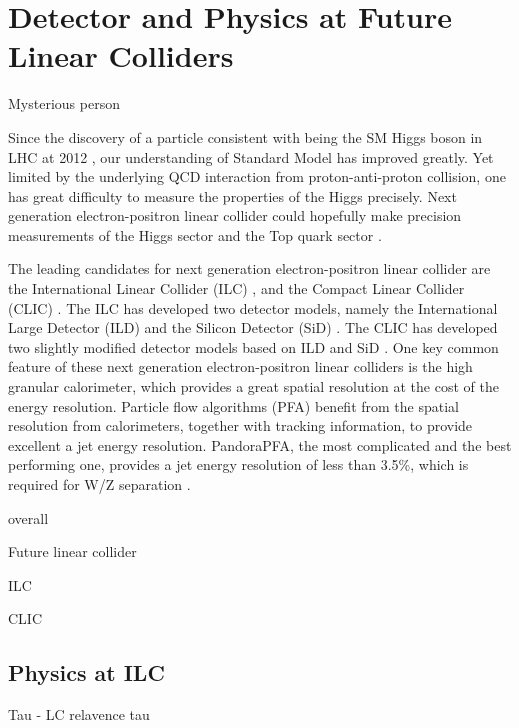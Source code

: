 \chapter{Detector and Physics at Future Linear Colliders}
\label{chap:Detector}

%
{Mysterious person}%





Since the discovery of a particle consistent with being the SM Higgs boson in LHC at 2012 \cite{Aad:2012tfa,Chatrchyan:2012ufa}, our understanding of Standard Model has improved greatly. Yet limited by the underlying QCD interaction from proton-anti-proton collision, one has great difficulty to measure the properties of the Higgs precisely. Next generation electron-positron linear collider could hopefully make precision measurements of the Higgs sector and the Top quark sector \cite{Abramowicz:2013tzc}.

The leading candidates for next generation electron-positron linear collider are the International Linear Collider (ILC) \cite{Brau:2007zza}, and the Compact Linear Collider (CLIC) \cite{Linssen:2012hp}. The ILC has developed two detector models, namely the International Large Detector (ILD) \cite{Abe:2010aa} and the Silicon Detector (SiD) \cite{Aihara:2010zz}. The CLIC has developed two slightly modified detector models based on ILD and SiD \cite{Linssen:2012hp}. One key common feature of these next generation electron-positron linear colliders is the high granular calorimeter, which provides a great spatial resolution at the cost of the energy resolution. Particle flow algorithms (PFA) benefit from the spatial resolution from calorimeters, together with tracking information, to provide excellent a jet energy resolution. PandoraPFA, the most complicated and the best performing one, provides a jet energy resolution of less than 3.5\%, which is required for W/Z separation \cite{Thomson:2009rp,Marshall:2013bda}.


overall

Future linear collider

ILC

CLIC



\section{Physics at ILC}

Tau - LC relavence tau

